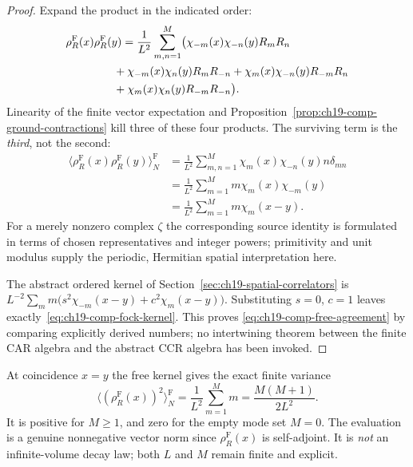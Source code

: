 \begin{proof}
Expand the product in the indicated order:
\begin{align*}
 &\rho_R^{\mathrm F}(x)\rho_R^{\mathrm F}(y)
 =\frac{1}{L^2}\sum_{m,n=1}^{M}\bigl(
 \chi_{-m}(x)\chi_{-n}(y)R_mR_n\\
 &\hspace{15mm}+\chi_{-m}(x)\chi_n(y)R_mR_{-n}
 +\chi_m(x)\chi_{-n}(y)R_{-m}R_n\\
 &\hspace{15mm}+\chi_m(x)\chi_n(y)R_{-m}R_{-n}\bigr).
\end{align*}
Linearity of the finite vector expectation and
Proposition~\ref{prop:ch19-comp-ground-contractions} kill three of
these four products.  The surviving term is the \emph{third}, not the
second:
\begin{align*}
 \langle\rho_R^{\mathrm F}(x)\rho_R^{\mathrm F}(y)
 \rangle_N^{\mathrm F}
 &=\frac{1}{L^2}\sum_{m,n=1}^{M}
 \chi_m(x)\chi_{-n}(y)n\delta_{mn}\\
 &=\frac{1}{L^2}\sum_{m=1}^{M}
 m\chi_m(x)\chi_{-m}(y)\\
 &=\frac{1}{L^2}\sum_{m=1}^{M}m\chi_m(x-y).
\end{align*}
For a merely nonzero complex $\zeta$ the corresponding source identity
is formulated in terms of chosen representatives and integer powers;
primitivity and unit modulus supply the periodic, Hermitian spatial
interpretation here.

The abstract ordered kernel of Section~\ref{sec:ch19-spatial-correlators}
is $L^{-2}\sum_m m\bigl(s^2\chi_{-m}(x-y)
+c^2\chi_m(x-y)\bigr)$.  Substituting $s=0$, $c=1$ leaves
exactly~\eqref{eq:ch19-comp-fock-kernel}.  This proves
\eqref{eq:ch19-comp-free-agreement} by comparing explicitly derived
numbers; no intertwining theorem between the finite CAR algebra and the
abstract CCR algebra has been invoked.
\end{proof}

At coincidence $x=y$ the free kernel gives the exact finite variance
\begin{equation}
 \langle(\rho_R^{\mathrm F}(x))^2\rangle_N^{\mathrm F}
 =\frac{1}{L^2}\sum_{m=1}^{M}m
 =\frac{M(M+1)}{2L^2}.
 \label{eq:ch19-comp-fock-diagonal}
\end{equation}
It is positive for $M\geq1$, and zero for the empty mode set $M=0$.
The evaluation is a genuine nonnegative vector norm since
$\rho_R^{\mathrm F}(x)$ is self-adjoint.  It is \emph{not} an
infinite-volume decay law; both $L$ and $M$ remain finite and explicit.

